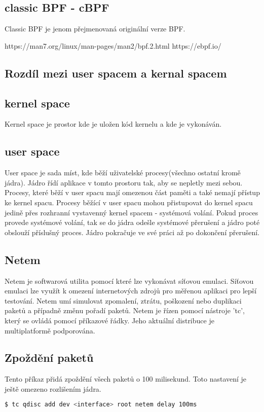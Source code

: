 \subsection*{classic BPF - cBPF}
Classic BPF je jenom přejmenovaná originální verze BPF.

https://man7.org/linux/man-pages/man2/bpf.2.html
https://ebpf.io/

\subsection{Rozdíl mezi user spacem a kernal spacem}
\subsection*{kernel space}
Kernel space je prostor kde je uložen kód kernelu a kde je vykonáván.

\subsection*{user space}
User space je sada míst, kde běží uživatelské procesy(všechno ostatní kromě jádra). Jádro řídí aplikace v tomto prostoru tak, aby se nepletly mezi sebou.
Procesy, které běží v user spacu mají omezenou část paměti a také nemají přístup ke kernel spacu. Procesy běžící v user spacu mohou přistupovat do kernel spacu
jedině přes rozhranní vystavenný kernel spacem - systémová volání. Pokud proces provede systémové volání, tak se do jádra odešle systémové přerušení a jádro poté obslouží
příslušný proces. Jádro pokračuje ve své práci až po dokončení přerušení.

\subsection{Netem}
Netem je softwarová utilita pomocí které lze vykonávat síťovou emulaci. Síťovou emulaci lze využít k omezení internetových zdrojů pro měřenou aplikaci pro lepší testování.
Netem umí simulovat zpomalení, ztrátu, poškození nebo duplikaci paketů a případně změnu pořadí paketů. Netem je řízen pomocí nástroje 'tc', který se ovládá pomocí příkazové řádky.
Jeho aktuální distribuce je multiplatformě podporována.

\subsection*{Zpoždění paketů}
Tento příkaz přidá zpoždění všech paketů o 100 milisekund. Toto nastavení je ještě omezeno rozlišením jádra.
\begin{lstlisting}[language=bash]
    $ tc qdisc add dev <interface> root netem delay 100ms
\end{lstlisting}

